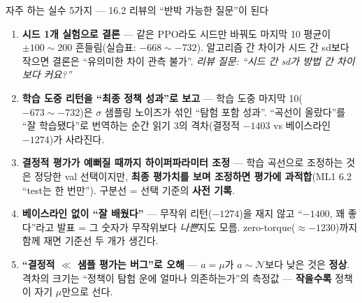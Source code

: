 \documentclass[aspectratio=169,11pt]{beamer}
\begin{document}
\begin{frame}{자주 하는 실수 5가지 — 16.2 리뷰의 ``반박 가능한 질문''이 된다}
  \small
  \begin{enumerate}
    \item \textbf{시드 1개 실험으로 결론} — 같은 PPO라도 시드만 바꿔도
      마지막 10 평균이 $\pm100\sim200$ 흔들림(실습표: $-668\sim-732$).
      알고리즘 간 차이가 시드 간 sd보다 작으면 결론은 ``유의미한 차이
      관측 불가''. \emph{리뷰 질문: ``시드 간 sd가 방법 간 차이보다 커요?''}
    \item \textbf{학습 도중 리턴을 ``최종 정책 성과''로 보고} — 학습 도중
      마지막 10($-673\sim-732$)은 $\sigma$ 샘플링 노이즈가 섞인 ``탐험
      포함 성과''. ``곡선이 올랐다''를 ``잘 학습됐다''로 번역하는 순간
      읽기 3의 격차(결정적 $-1403$ vs 베이스라인 $-1274$)가 사라진다.
    \item \textbf{결정적 평가가 예뻐질 때까지 하이퍼파라미터 조정} —
      학습 곡선으로 조정하는 것은 정당한 val 선택이지만, \textbf{최종
      평가치를 보며 조정하면 평가에 과적합}(ML1 6.2 ``test는 한 번만'').
      구분선 = 선택 기준의 \textbf{사전 기록}.
    \item \textbf{베이스라인 없이 ``잘 배웠다''} — 무작위 리턴($-1274$)을
      재지 않고 ``$-1400$, 꽤 좋다''라고 발표 = 그 숫자가 무작위보다
      \emph{나쁜}지도 모름. zero-torque($\approx-1230$)까지 함께 재면
      기준선 두 개가 생긴다.
    \item \textbf{``결정적 $\ll$ 샘플 평가는 버그''로 오해} — $a=\mu$가
      $a\sim\mathcal{N}$보다 낮은 것은 \textbf{정상}. 격차의 크기는
      ``정책이 탐험 운에 얼마나 의존하는가''의 측정값 — \textbf{작을수록}
      정책이 자기 $\mu$만으로 선다.
  \end{enumerate}
\end{frame}
\end{document}
